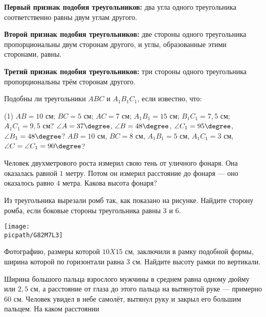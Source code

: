 \begin{class}[number=3]
	\begin{definit}
		\textbf{Первый признак подобия треугольников:} два угла одного треугольника соответственно равны двум углам другого.
	\end{definit}
	\begin{definit}
		\textbf{Второй признак подобия треугольников:} две стороны одного треугольника пропорциональны двум сторонам другого, и углы, образованные этими сторонами, равны.
	\end{definit}
	\begin{definit}
		\textbf{Третий признак подобия треугольников:} три стороны одного треугольника пропорциональны трём сторонам другого.
	\end{definit}
	\begin{listofex}
		\item Подобны ли треугольники \( ABC \) и \( A_1B_1C_1\), если известно, что:
		\begin{tasks}(1)
		\task \(AB=10\) см; \(BC=5\) см; \( AC=7 \) см; \( A_1B_1=15\) см; \( B_1C_1=7,5\) см; \(A_1C_1=9,5\) см?
		\task \( \angle A=37\degree \), \( \angle B=48\degree\), \( \angle C_1=95\degree \), \( \angle B_1= 48\degree \)?
		\task \( AB=10 \) см, \(BC=8\) см, \(A_1B_1=5\) см, \(A_1C_1=3\) см, \(\angle C=\angle C_1=90\degree\)?
	\end{tasks}
		\item Человек двухметрового роста измерил свою тень от уличного фонаря. Она оказалась равной \( 1 \) метру. Потом он измерил расстояние до фонаря --- оно оказалось равно \( 4 \) метра. Какова высота фонаря?
		\item Из треугольника вырезали ромб так, как показано на рисунке. Найдите сторону ромба, если боковые стороны треугольника равны \( 3 \) и \( 6 \).
		\begin{center}
			\texttt{[image: \\picpath/G82M7L3]}
		\end{center}
		\item Фотографию, размеры которой \( 10 X 15 \) см, заключили в рамку подобной формы, ширина которой по горизонтали равна \( 3 \) см. Найдите высоту рамки по вертикали.
		\item Ширина большого пальца взрослого мужчины в среднем равна одному дюйму или
		\( 2,5 \) см, а расстояние от глаза до этого пальца на вытянутой руке --- примерно \( 60 \) см. Человек	увидел в небе самолёт, вытянул руку и закрыл его большим пальцем. На каком расстоянии

\end{listofex}
\end{class}
